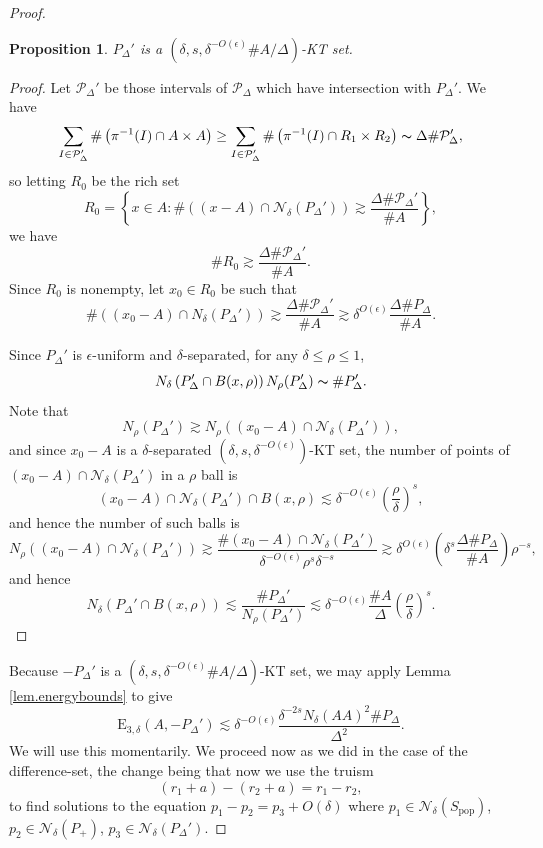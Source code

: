 \documentclass[10pt,a4paper]{amsart}
\newtheorem{proposition}{Proposition}
\begin{document}
\begin{proof}
\begin{proposition}\label{prop:pdeltaKT}
\(P_{\Delta} '\) is a \((\delta ,s , \delta^{-O (\epsilon)} \# A / \Delta)\)-KT set. 
\end{proposition}
\begin{proof}
Let \(\mathcal{P} _{\Delta} '\) be those intervals of \(\mathcal{P} _{\Delta} \) which have intersection
with \(P_{\Delta} '\). We have
\[
	\sum _{I \in \mathcal{P} _{\Delta} '}  \#  \left( \pi ^{-1} (I) \cap A \times A \right) \geq  \sum _{I \in \mathcal{P} _{\Delta} '} \#  \left( \pi ^{-1} (I) \cap R_1 \times R_2 \right) \thicksim \Delta \# \mathcal{P} _{\Delta} '
,\]
so letting \(R_0\) be the rich set
\[
	R_0 = \left\{ x \in A  : \# \left( (x - A) \cap \mathcal{N} _{\delta} (P_{\Delta} ') \right) \gtrsim \frac{\Delta \# \mathcal{P} _{\Delta} '}{\# A} \right\}  
,\]
we have
\[
	\# R_0 \gtrsim \frac{\Delta \# \mathcal{P} _{\Delta}' }{\# A}
.\]
Since \(R_0\) is nonempty, let \(x_0 \in R_0\) be such that
\[
	\# \left( (x_0-A)\cap N_{\delta} (P_{\Delta} ') \right) \gtrsim \frac{\Delta \# \mathcal{P} _{\Delta} '}{\# A } \gtrsim \delta^{O(\epsilon)}\frac{\Delta \# P_{\Delta} }{\# A}    
.\]

Since \(P_{\Delta} '\) is \(\epsilon\)-uniform and \(\delta\)-separated, for any \(\delta \leq \rho \leq 1\),
\[
	N_{\delta} \left( P_{\Delta} ' \cap B(x,\rho) \right) N_{\rho} (P_{\Delta} ') \thicksim \# P_{\Delta} '
.\]
Note that
\[
	N_{\rho} (P_{\Delta} ') \gtrsim  N_{\rho} \left( (x_0 - A)\cap \mathcal{N} _{\delta} (P_{\Delta} ') \right) 
,\]
and since \(x_0 - A\) is a \(\delta\)-separated \((\delta,s, \delta^{-O(\epsilon)})\)-KT set, the number of
points of \((x_0 - A)\cap \mathcal{N} _{\delta} (P_{\Delta} ') \) in a \(\rho\) ball is
\[
	(x_0 - A)\cap \mathcal{N} _{\delta} (P_{\Delta} ')\cap B(x,\rho)  \lesssim \delta^{-O(\epsilon)} \left( \frac{\rho}{\delta}  \right) ^{s}
,\]
and hence the number of such balls is 
\[
	N_{\rho} \left( (x_0 - A)\cap \mathcal{N} _{\delta} (P_{\Delta} ') \right) \gtrsim \frac{\# \left( x_0 - A \right) \cap \mathcal{N} _{\delta} (P_{\Delta} ')}{\delta^{-O(\epsilon)} \rho^{s} \delta^{-s}}    \gtrsim \delta^{O(\epsilon)} \left( \delta^{s} \frac{\Delta \# P_{\Delta} }{\# A}  \right) \rho ^{-s}
,\]
and hence
\[
	N_{\delta} \left( P_{\Delta} ' \cap B(x,\rho) \right) \lesssim \frac{\# P_{\Delta} '}{N_{\rho} (P_{\Delta} ')   } \lesssim \delta^{- O(\epsilon)} \frac{\# A}{\Delta}  \left( \frac{\rho}{\delta}  \right) ^{s}
.\] 
\end{proof}
Because \(- P_{\Delta} '\) is a \((\delta,s,\delta^{-O(\epsilon)} \# A / \Delta)\)-KT set, we may apply Lemma \ref{lem.energybounds} to give
\[
	\mathrm{E} _{3,\delta} (A,- P_{\Delta} ')\lesssim \delta^{-O(\epsilon)} \frac{\delta^{-2s} N_{\delta} (AA)^{2} \# P_{\Delta} }{\Delta^{2}} 
.\]
We will use this momentarily.
We proceed now as we did in the case of the difference-set, the change being that now we use the
truism
\[
	(r_1 + a) - (r_2 + a) = r_1 - r_2
,\]
to find solutions to the equation \(p_1 - p_2 = p_3 + O(\delta)\) where \(p_1 \in \mathcal{N} _{\delta} (S_{\text{pop}} ) \), \(p_2 \in \mathcal{N} _{\delta} (P_{+}) \), \(p_3 \in \mathcal{N} _{\delta} (P_{\Delta}' )\). 


\end{proof}
\end{document}
